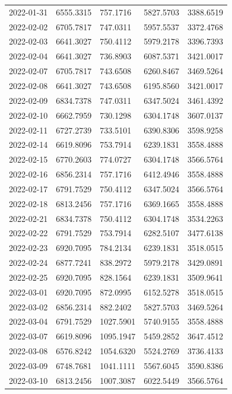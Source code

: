 \begin{footnotesize}
\begin{longtable}{lllll}
2022-01-31 & 6555.3315 & 757.1716 & 5827.5703 & 3388.6519 \\
2022-02-02 & 6705.7817 & 747.0311 & 5957.5537 & 3372.4768 \\
2022-02-03 & 6641.3027 & 750.4112 & 5979.2178 & 3396.7393 \\
2022-02-04 & 6641.3027 & 736.8903 & 6087.5371 & 3421.0017 \\
2022-02-07 & 6705.7817 & 743.6508 & 6260.8467 & 3469.5264 \\
2022-02-08 & 6641.3027 & 743.6508 & 6195.8560 & 3421.0017 \\
2022-02-09 & 6834.7378 & 747.0311 & 6347.5024 & 3461.4392 \\
2022-02-10 & 6662.7959 & 730.1298 & 6304.1748 & 3607.0137 \\
2022-02-11 & 6727.2739 & 733.5101 & 6390.8306 & 3598.9258 \\
2022-02-14 & 6619.8096 & 753.7914 & 6239.1831 & 3558.4888 \\
2022-02-15 & 6770.2603 & 774.0727 & 6304.1748 & 3566.5764 \\
2022-02-16 & 6856.2314 & 757.1716 & 6412.4946 & 3558.4888 \\
2022-02-17 & 6791.7529 & 750.4112 & 6347.5024 & 3566.5764 \\
2022-02-18 & 6813.2456 & 757.1716 & 6369.1665 & 3558.4888 \\
2022-02-21 & 6834.7378 & 750.4112 & 6304.1748 & 3534.2263 \\
2022-02-22 & 6791.7529 & 753.7914 & 6282.5107 & 3477.6138 \\
2022-02-23 & 6920.7095 & 784.2134 & 6239.1831 & 3518.0515 \\
2022-02-24 & 6877.7241 & 838.2972 & 5979.2178 & 3429.0891 \\
2022-02-25 & 6920.7095 & 828.1564 & 6239.1831 & 3509.9641 \\
2022-03-01 & 6920.7095 & 872.0995 & 6152.5278 & 3518.0515 \\
2022-03-02 & 6856.2314 & 882.2402 & 5827.5703 & 3469.5264 \\
2022-03-04 & 6791.7529 & 1027.5901 & 5740.9155 & 3558.4888 \\
2022-03-07 & 6619.8096 & 1095.1947 & 5459.2852 & 3647.4512 \\
2022-03-08 & 6576.8242 & 1054.6320 & 5524.2769 & 3736.4133 \\
2022-03-09 & 6748.7681 & 1041.1111 & 5567.6045 & 3590.8386 \\
2022-03-10 & 6813.2456 & 1007.3087 & 6022.5449 & 3566.5764 \\

\end{longtable}
\end{footnotesize}
